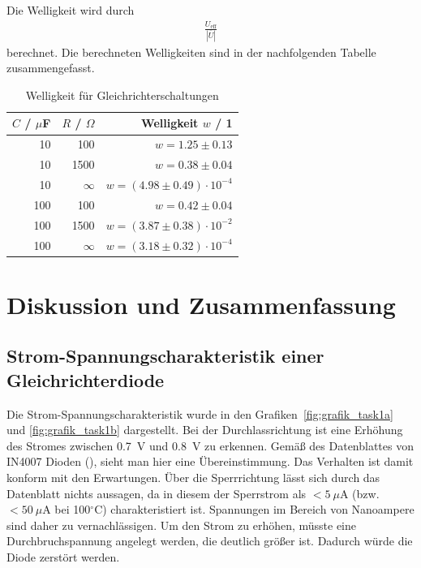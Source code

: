 \documentclass{article}
\begin{document}
Die Welligkeit wird durch
\begin{align*}
\frac{U_\text{eff}}{|\overline{U}|}
\end{align*}
berechnet. Die berechneten Welligkeiten sind in der nachfolgenden Tabelle zusammengefasst.


\begin{table}[H]
\caption{Welligkeit für Gleichrichterschaltungen}
\label{tab:welligkeit}
\begin{tabular}{rr|r}
$C$ / $\mu$F & $R$ / $\Omega$ & Welligkeit $w$  / 1 \\
\hline
10 & 100 & $w = 1.25 \pm 0.13$ \\
10 & 1500 & $w = 0.38 \pm 0.04$ \\
10 & $\infty$ & $w = (4.98 \pm 0.49)\cdot 10^{-4} $ \\
100 & 100 & $w = 0.42 \pm 0.04$ \\
100 & 1500 & $w = (3.87 \pm 0.38) \cdot 10^{-2}$\\
100 & $\infty$ & $w = (3.18 \pm 0.32) \cdot 10^{-4}$
\end{tabular}

\end{table}

\section{Diskussion und Zusammenfassung}

\subsection{Strom-Spannungscharakteristik einer Gleichrichterdiode}

Die Strom-Spannungscharakteristik wurde in den Grafiken~\ref{fig:grafik_task1a} und \ref{fig:grafik_task1b} dargestellt. Bei der Durchlassrichtung ist eine Erhöhung des Stromes zwischen 0.7~V und 0.8~V zu erkennen. Gemäß des Datenblattes von IN4007 Dioden (\cite{conrad_diode1}), sieht man hier eine Übereinstimmung. Das Verhalten ist damit konform mit den Erwartungen. Über die Sperrrichtung lässt sich durch das Datenblatt nichts aussagen, da in diesem der Sperrstrom als $<5~\mu$A (bzw. $<50~\mu$A bei 100$^\circ$C) charakteristiert ist. Spannungen im Bereich von Nanoampere sind daher zu vernachlässigen. Um den Strom zu erhöhen, müsste eine Durchbruchspannung angelegt werden, die deutlich größer ist. Dadurch würde die Diode zerstört werden.
\end{document}
